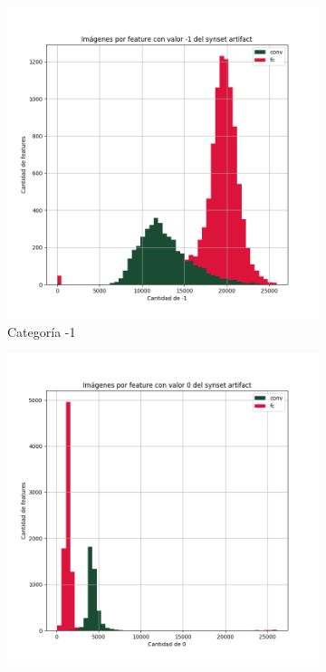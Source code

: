 \documentclass[12,twoside]{TFG-GM}
\theoremstyle{definition}
\theoremstyle{remark}
\begin{document}
\begin{figure}[ht] 
	\centering
	\begin{subfigure}[b]{0.3\textwidth}
		\includegraphics[width=\textwidth] {Images/plots/25/synsets/Images_per_feature_of_-1_category_artifactall_layers.png}
		\caption{Categoría -1}
	\end{subfigure}
	\begin{subfigure}[b]{0.3\textwidth}
		\includegraphics[width=\textwidth]  {Images/plots/25/synsets/Images_per_feature_of_0_category_artifactall_layers.png}

\end{subfigure}
\end{figure}
\end{document}
